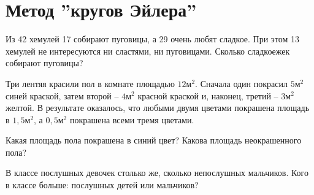 \section{Метод ''кругов Эйлера''}

\begin{thm}
Из 42 хемулей 17 собирают пуговицы, а 29 очень любят сладкое. При этом 13 хемулей не
интересуются ни сластями, ни пуговицами. Сколько сладкоежек собирают пуговицы?
\end{thm}

\begin{thm}
Три лентяя красили пол в комнате площадью $12м^2$. Сначала один покрасил $5м^2$ синей краской, затем второй – $4м^2$ красной краской и, наконец, третий – $3м^2$ желтой. В результате оказалось, что любыми двумя цветами покрашена площадь в $1,5м^2$, а $0,5м^2$ покрашена всеми тремя цветами. 
\par
Какая площадь пола покрашена в синий цвет? Какова площадь неокрашенного пола?
\end{thm}

\begin{thm}
В классе послушных девочек столько же, сколько непослушных мальчиков. Кого в классе
больше: послушных детей или мальчиков?
\end{thm}


